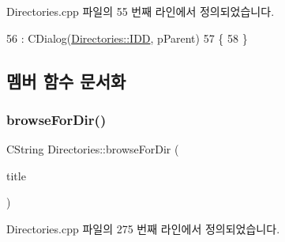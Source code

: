 Directories.\+cpp 파일의 55 번째 라인에서 정의되었습니다.


\begin{DoxyCode}
56   : CDialog(\mbox{\hyperlink{class_directories_af0d05207ae8fd4572edf7950c207d6c0a6b2cbc79bd35885c2f543f480aa0b2e6}{Directories::IDD}}, pParent)
57 \{
58 \}
\end{DoxyCode}


\subsection{멤버 함수 문서화}
\mbox{\label{class_directories_a7e24bf265fe6af9c01e0939952c337e1}} 
\subsubsection{\texorpdfstring{browse\+For\+Dir()}{browseForDir()}}
{\footnotesize\ttfamily C\+String Directories\+::browse\+For\+Dir (\begin{DoxyParamCaption}\item[{C\+String}]{title }\end{DoxyParamCaption})}



Directories.\+cpp 파일의 275 번째 라인에서 정의되었습니다.


